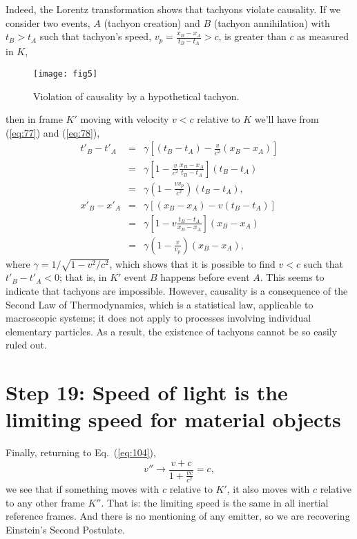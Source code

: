 \documentclass[twocolumn,preprintnumbers,amsmath,amssymb,final]{revtex4}
\def\BEqA{\begin{eqnarray}}
\def\EEqA{\end{eqnarray}}
\begin{document}
\noindent Indeed, the Lorentz transformation shows that tachyons violate causality. 
If we consider two events,
$A$ (tachyon creation) and $B$ (tachyon annihilation) with $t_B>t_A$ 
such that tachyon's speed, $v_p =  \frac{x_B-x_A}{t_B-t_A}>c$, is greater than $c$ 
as measured in $K$,
\begin{figure}[!ht]
\texttt{[image: fig5]}
\caption{ \label{fig:5} 
Violation of causality by a hypothetical tachyon.
}
\end{figure}
then in frame $K'$ moving with velocity $v<c$ relative to $K$ 
we'll have
from (\ref{eq:77}) and (\ref{eq:78}),
\BEqA
t'_{B}-t'_{A}&=&
\gamma
\left[
\left(t_{B}-t_{A}\right)
-\frac{v}{c^2}\left(x_{B}-x_{A}\right)
\right]
\nonumber \\
&=&
\gamma
\left[
1
-\frac{v}{c^2}\frac{x_{B}-x_{A}}{t_{B}-t_{A}}
\right]
\left(t_{B}-t_{A}\right)
\nonumber \\
&=&
\gamma
\left(
1
-\frac{vv_p}{c^2}
\right)
\left(t_{B}-t_{A}\right),
\\
x'_{B}-x'_{A}&=&
\gamma
\left[
\left(x_{B}-x_{A}\right)-v\left(t_{B}-t_{A}\right)
\right]
\nonumber \\
&=&
\gamma
\left[
1-v\frac{t_{B}-t_{A}}{x_{B}-x_{A}}
\right]\left(x_{B}-x_{A}\right)
\nonumber \\
&=&
\gamma
\left(
1-\frac{v}{v_p}
\right)\left(x_{B}-x_{A}\right),
\EEqA
where $\gamma = 1/\sqrt{1-v^2/c^2}$, which shows that it is possible to find $v<c$
such that  $t'_{B}-t'_{A} <0$; that is, in $K'$ event $B$ happens before event $A$. 
This seems to indicate that tachyons are impossible. 
However, causality is a consequence of the Second Law of Thermodynamics, which 
is a statistical law, applicable to macroscopic systems; it does not apply to processes
involving individual elementary particles. As a result, the existence of tachyons cannot be 
so easily ruled out.




\section*{Step 19: Speed of light is the limiting speed for material objects}

Finally, returning to Eq.\ (\ref{eq:104}), 
\[
v''\rightarrow\frac{v+c}{1+\frac{vc}{c^2}}=c,
\]
we see that if something moves with $c$ relative to $K'$,
it also moves with $c$ relative to any other frame $K''$. 
That is: the limiting speed is the same in all inertial reference frames. 
And there is no mentioning of any emitter, so 
we are recovering Einstein's Second Postulate.
\end{document}
